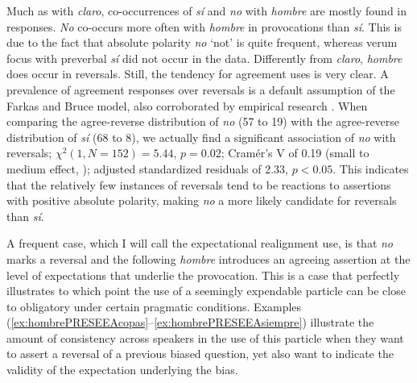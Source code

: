 Much as with \textit{claro}, co-occurrences of \textit{sí} and \textit{no} with \textit{hombre} are mostly found in responses. \textit{No} co-occurs more often with \textit{hombre} in provocations than \textit{sí}. This is due to the fact that absolute polarity \textit{no} `not' is quite frequent, whereas verum focus with preverbal \textit{sí} did not occur in the data. Differently from \textit{claro}, \textit{hombre} does occur in reversals. Still, the tendency for agreement uses is very clear. A prevalence of agreement responses over reversals is a default assumption of the Farkas and Bruce model, also corroborated by empirical research \citep{BogelsKendrickLevinson.2015}. When comparing the agree-reverse distribution of \textit{no} (57 to 19) with the agree-reverse distribution of \textit{sí} (68 to 8), we actually find a significant association of \textit{no} with reversals; $\chi^2 (1, N = 152) = 5.44$, $ p = 0.02$; Cramér's V of 0.19 (small to medium effect, \cite[222]{Cohen.19882013}); adjusted standardized residuals of 2.33, $p<0.05$. This indicates that the relatively few instances of reversals tend to be reactions to assertions with positive absolute polarity, making \textit{no} a more likely candidate for reversals than \textit{sí}.

A frequent case, which I will call the expectational realignment use, is that \textit{no} marks a reversal and the following \textit{hombre} introduces an agreeing assertion at the level of expectations that underlie the provocation. This is a case that perfectly illustrates to which point the use of a seemingly expendable particle can be close to obligatory under certain pragmatic conditions. Examples (\ref{ex:hombrePRESEEAcopas}--\ref{ex:hombrePRESEEAsiempre}) illustrate the amount of consistency across speakers in the use of this particle when they want to assert a reversal of a previous biased question, yet also want to indicate the validity of the expectation underlying the bias.\largerpage[2]


